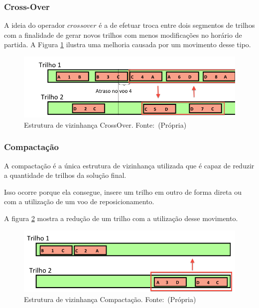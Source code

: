  \subsubsection{Cross-Over}
 
A ideia do operador $crossover$ é a de efetuar troca entre dois segmentos de
trilhos com a finalidade de gerar novos trilhos com menos modificações no
horário de partida. A Figura \ref{fig:crossover} ilustra uma melhoria causada por um
movimento desse tipo.


\begin{figure}[ht]
	\caption{Estrutura de vizinhança CrossOver. \mbox{Fonte:
	(Própria)}}\label{fig:crossover}
	\includegraphics[scale=0.4]{./img/crossover}
	
\end{figure}
 
 \subsubsection{Compactação}
 
A compactação é a única estrutura de vizinhança utilizada que é capaz de
reduzir a quantidade de trilhos da solução final.
 
Isso ocorre porque ela consegue, insere um trilho em outro de forma direta ou
com a utilização de um voo de reposicionamento.
 
A figura \ref{fig:compactacao} mostra a redução de um trilho com a utilização
desse movimento.

\begin{figure}[ht] 
	\caption{Estrutura de vizinhança Compactação. \mbox{Fonte:
	(Própria)}}\label{fig:compactacao}
	\includegraphics[scale=0.4]{./img/compactacao}
	
\end{figure}
 
